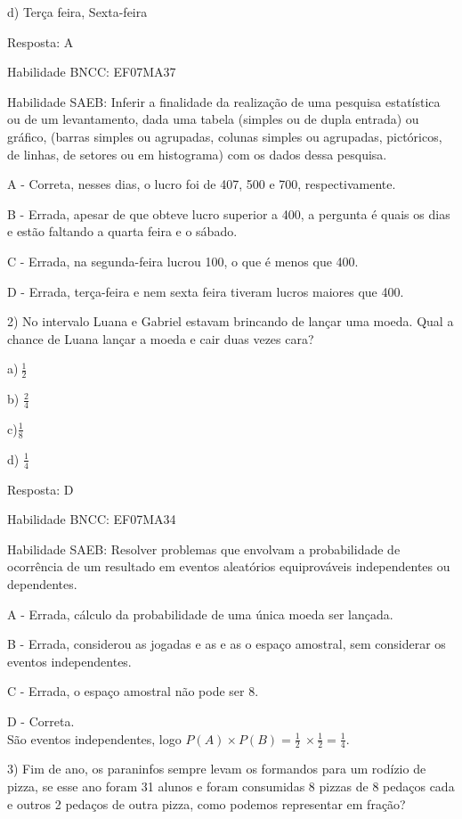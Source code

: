 d) Terça feira, Sexta-feira

Resposta: A

Habilidade BNCC: EF07MA37

Habilidade SAEB: Inferir a finalidade da realização de uma pesquisa
estatística ou de um levantamento, dada uma tabela (simples ou de dupla
entrada) ou gráfico, (barras simples ou agrupadas, colunas simples ou
agrupadas, pictóricos, de linhas, de setores ou em histograma) com os
dados dessa pesquisa.~

A - Correta, nesses dias, o lucro foi de 407, 500 e 700,
respectivamente.

B - Errada, apesar de que obteve lucro superior a 400, a pergunta é
quais os dias e estão faltando a quarta feira e o sábado.

C - Errada, na segunda-feira lucrou 100, o que é menos que 400.

D - Errada, terça-feira e nem sexta feira tiveram lucros maiores que
400.

2) No intervalo Luana e Gabriel estavam brincando de lançar uma moeda.
Qual a chance de Luana lançar a moeda e cair duas vezes cara?

a)\(\ \frac{1}{2}\)

b) \(\frac{2}{4}\)

c)\(\frac{1}{8}\)

d) \(\frac{1}{4}\)

Resposta: D

Habilidade BNCC: EF07MA34

Habilidade SAEB: Resolver problemas que envolvam a probabilidade de
ocorrência de um resultado em eventos aleatórios equiprováveis
independentes ou dependentes.

A - Errada, cálculo da probabilidade de uma única moeda ser lançada.

B - Errada, considerou as jogadas e as e as o espaço amostral, sem
considerar os eventos independentes.

C - Errada, o espaço amostral não pode ser 8.

D - Correta.\\
São eventos independentes, logo
\(P\left( A \right) \times P\left( B \right) = \frac{1}{2}\  \times \frac{1}{2} = \frac{1}{4}\).

3) Fim de ano, os paraninfos sempre levam os formandos para um rodízio
de pizza, se esse ano foram 31 alunos e foram consumidas 8 pizzas de 8
pedaços cada e outros 2 pedaços de outra pizza, como podemos representar
em fração?

